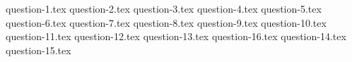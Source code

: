 \begin{enumerate}
  {question-1.tex}
  {question-2.tex}
  \newpage
  {question-3.tex}
  {question-4.tex}
  {question-5.tex}
  \newpage
  {question-6.tex}
  {question-7.tex}
  {question-8.tex}
  \newpage
  {question-9.tex}
  {question-10.tex}
  {question-11.tex}
  {question-12.tex}
  {question-13.tex}
  \newpage
  {question-16.tex}
  {question-14.tex}
  {question-15.tex}
\end{enumerate}